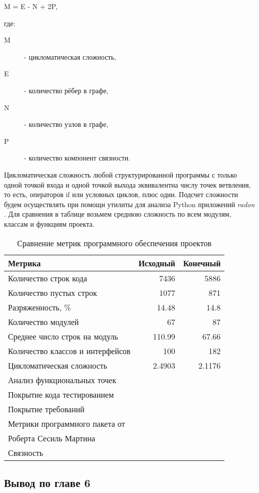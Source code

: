     \begin{center}
        M = E - N + 2P,
    \end{center}
    где:
    \begin{description}
        \item [M] - цикломатическая сложность,
        \item [E] - количество рёбер в графе,
        \item [N] - количество узлов в графе,
        \item [P] - количество компонент связности.
    \end{description}
    Цикломатическая сложность любой структурированной программы с только одной
    точкой входа и одной точкой выхода эквивалентна числу точек ветвления,
    то есть, операторов if или условных циклов, плюс один.
    Подсчет сложности будем осуществлять при помощи утилиты для анализа
    Python приложений \textit{radon} \cite{complexity.radon}. Для сравнения
    в таблице возьмем среднюю сложность по всем модулям, классам и функциям
    проекта.
    
    \begin{table}[H]
        \caption{Сравнение метрик программного обеспечения проектов}
        \begin{center}
            \begin{tabular}{l|r|r}
                \textbf{Метрика} & \textbf{Исходный} & \textbf{Конечный} \\
                \hline
                Количество строк кода               & 7436 & 5886 \\
                Количество пустых строк             & 1077 & 871 \\
                Разряженность, \%                   & 14.48 & 14.8 \\
                Количество модулей                  & 67 & 87 \\
                Среднее число строк на модуль       & 110.99 & 67.66 \\
                Количество классов и интерфейсов    & 100 & 182 \\
                Цикломатическая сложность           & 2.4903 & 2.1176 \\
                Анализ функциональных точек         & & \\
                Покрытие кода тестированием         & & \\
                Покрытие требований                 & & \\
                Метрики программного пакета от      & & \\
                Роберта Сесиль Мартина              & & \\
                Связность                           & & \\
            \end{tabular}
        \end{center}
    \end{table}

    \subsection*{Вывод по главе 6}
